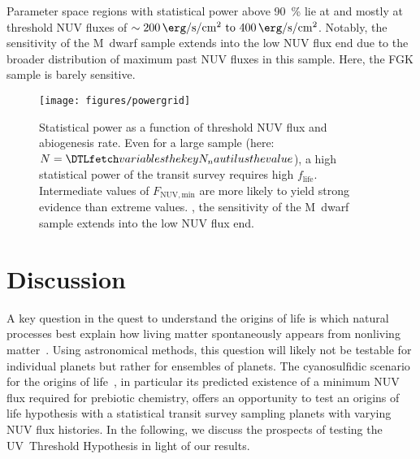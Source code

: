 \documentclass[twocolumn,twocolappendix,linenumbers]{aastex631}
\begin{document}
Parameter space regions with statistical power above \SI{90}{\percent} lie at  and mostly at threshold \gls{NUV} fluxes of $\sim \SIrange{200}{400}{\erg\per\second\per\centi\meter\squared}$.
Notably, the sensitivity of the M~dwarf sample extends into the low \gls{NUV} flux end due to the broader distribution of maximum past \gls{NUV} fluxes in this sample.
Here, the FGK sample is barely sensitive.


\begin{figure*}
    \begin{centering}
        \texttt{[image: figures/powergrid]}
        \caption{Statistical power as a function of threshold \gls{NUV} flux and abiogenesis rate. Even for a large sample (here: $N=\var{N_nautilus}$), a high statistical power of the transit survey requires high  $f_\mathrm{life}$.
         Intermediate values of $F_\mathrm{NUV, min}$ are more likely to yield strong evidence than extreme values. , the sensitivity of the M~dwarf sample extends into the low \gls{NUV} flux end.
         }
        \label{fig:powergrid}
    \end{centering}
\end{figure*}



\section{Discussion}
\label{sec:discussion}
A key question in the quest to understand the origins of life is which natural processes best explain how living matter spontaneously appears from nonliving matter~\citep[e.g.,][]{Malaterre2022}.
Using astronomical methods, this question will likely not be testable for individual planets but rather for ensembles of planets.
The cyanosulfidic scenario for the origins of life~\citep{Patel2015}, in particular its predicted existence of a minimum \gls{NUV} flux required for prebiotic chemistry, offers an opportunity to test an origins of life hypothesis with a statistical transit survey sampling planets with varying \gls{NUV} flux histories.
In the following, we discuss the prospects of testing the UV~Threshold Hypothesis in light of our results.
\end{document}
